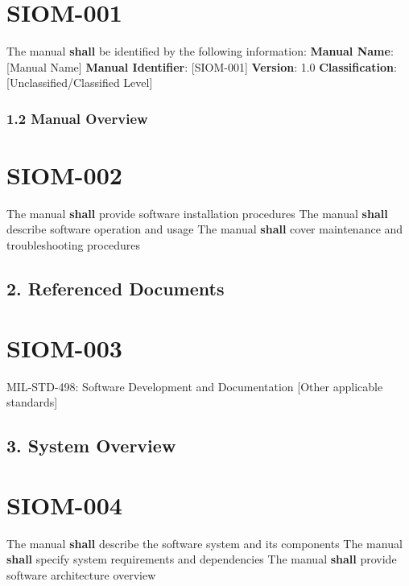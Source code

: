 \section{SIOM-001}\label{SIOM-001}

The manual \textbf{shall} be identified by the following information:
\textbf{Manual Name}: [Manual Name]
\textbf{Manual Identifier}: [SIOM-001]
\textbf{Version}: 1.0
\textbf{Classification}: [Unclassified/Classified Level]

\subsubsection{1.2 Manual Overview}

\section{SIOM-002}\label{SIOM-002}

The manual \textbf{shall} provide software installation procedures
The manual \textbf{shall} describe software operation and usage
The manual \textbf{shall} cover maintenance and troubleshooting procedures

\subsection{2. Referenced Documents}

\section{SIOM-003}\label{SIOM-003}

MIL-STD-498: Software Development and Documentation
[Other applicable standards]\\

\subsection{3. System Overview}

\section{SIOM-004}\label{SIOM-004}

The manual \textbf{shall} describe the software system and its components
The manual \textbf{shall} specify system requirements and dependencies
The manual \textbf{shall} provide software architecture overview

